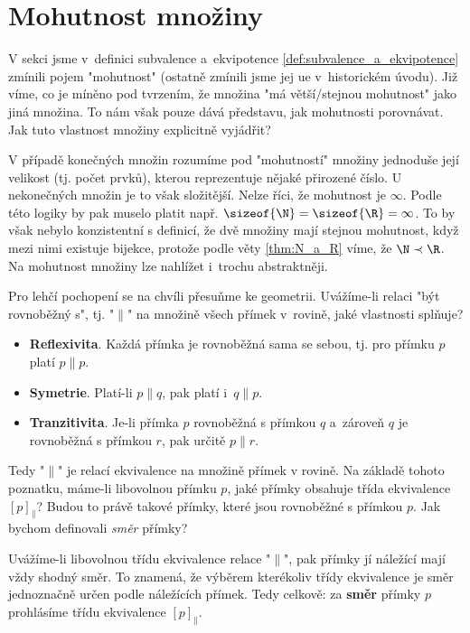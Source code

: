 \section{Mohutnost množiny}\label{sec:mohutnost_mnoziny}
V sekci jsme v~definici subvalence a~ekvipotence \ref{def:subvalence_a_ekvipotence} zmínili pojem "mohutnost" (ostatně zmínili jsme jej ue v~historickém úvodu). Již víme, co je míněno pod tvrzením, že množina "má větší/stejnou mohutnost" jako jiná množina. To nám však pouze dává představu, jak mohutnosti porovnávat. Jak tuto vlastnost množiny explicitně vyjádřit?\par
V případě konečných množin rozumíme pod "mohutností" množiny jednoduše její velikost (tj. počet prvků), kterou reprezentuje nějaké přirozené číslo. U nekonečných množin je to však složitější. Nelze říci, že mohutnost je $\infty$. Podle této logiky by pak muselo platit např. $\sizeof{\N}=\sizeof{\R}=\infty$. To by však nebylo konzistentní s definicí, že dvě množiny mají stejnou mohutnost, když mezi nimi existuje bijekce, protože podle věty \ref{thm:N_a_R} víme, že $\N\prec\R$. Na mohutnost množiny lze nahlížet i~trochu abstraktněji.
\medskip

Pro lehčí pochopení se na chvíli přesuňme ke geometrii. Uvážíme-li relaci "být rovnoběžný s", tj. "$\parallel$" na množině všech přímek v~rovině, jaké vlastnosti splňuje?
\begin{itemize}
    \item \textbf{Reflexivita}. Každá přímka je rovnoběžná sama se sebou, tj. pro přímku $p$ platí $p\parallel p$.
    \item \textbf{Symetrie}. Platí-li $p\parallel q$, pak platí i~$q\parallel p$.
    \item \textbf{Tranzitivita}. Je-li přímka $p$ rovnoběžná s přímkou $q$ a~zároveň $q$ je rovnoběžná s přímkou $r$, pak určitě $p\parallel r$.
\end{itemize}
Tedy "$\parallel$" je relací ekvivalence na množině přímek v rovině. Na základě tohoto poznatku, máme-li libovolnou přímku $p$, jaké přímky obsahuje třída ekvivalence $[p]_\parallel$? Budou to právě takové přímky, které jsou rovnoběžné s přímkou $p$. Jak bychom definovali \emph{směr} přímky?\par
Uvážíme-li libovolnou třídu ekvivalence relace "$\parallel$", pak přímky jí náležící mají vždy shodný směr. To znamená, že výběrem kterékoliv třídy ekvivalence je směr jednoznačně určen podle náležících přímek. Tedy celkově: za \textbf{směr} přímky $p$ prohlásíme třídu ekvivalence $[p]_\parallel$.
\medskip

